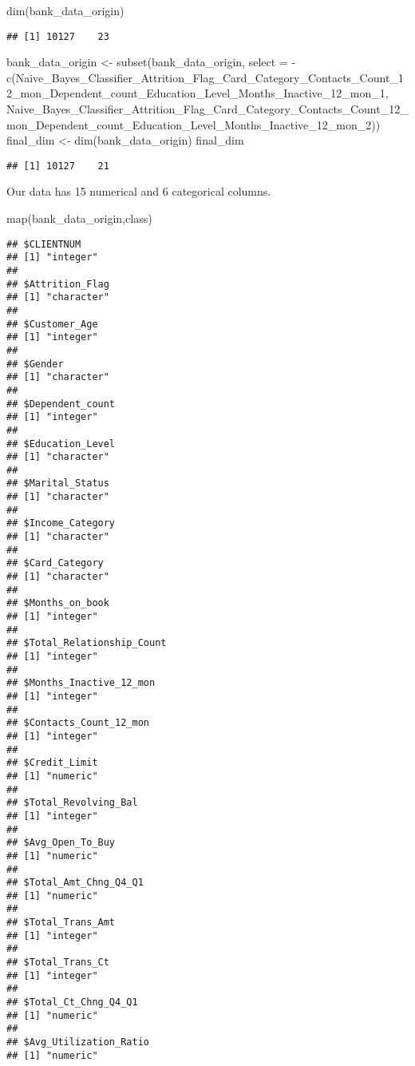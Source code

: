 \documentclass[
]{article}
\newenvironment{Shaded}{\begin{snugshade}}{\end{snugshade}}
\newcommand{\AttributeTok}[1]{\textcolor[rgb]{0.77,0.63,0.00}{#1}}
\newcommand{\FunctionTok}[1]{\textcolor[rgb]{0.00,0.00,0.00}{#1}}
\newcommand{\NormalTok}[1]{#1}
\newcommand{\OtherTok}[1]{\textcolor[rgb]{0.56,0.35,0.01}{#1}}
\newcommand{\SpecialCharTok}[1]{\textcolor[rgb]{0.00,0.00,0.00}{#1}}
\begin{document}
\begin{Shaded}
\begin{Highlighting}[]
\FunctionTok{dim}\NormalTok{(bank\_data\_origin)}
\end{Highlighting}
\end{Shaded}

\begin{verbatim}
## [1] 10127    23
\end{verbatim}

\begin{Shaded}
\begin{Highlighting}[]
\NormalTok{bank\_data\_origin }\OtherTok{\textless{}{-}} \FunctionTok{subset}\NormalTok{(bank\_data\_origin, }\AttributeTok{select =} \SpecialCharTok{{-}}\FunctionTok{c}\NormalTok{(Naive\_Bayes\_Classifier\_Attrition\_Flag\_Card\_Category\_Contacts\_Count\_12\_mon\_Dependent\_count\_Education\_Level\_Months\_Inactive\_12\_mon\_1, Naive\_Bayes\_Classifier\_Attrition\_Flag\_Card\_Category\_Contacts\_Count\_12\_mon\_Dependent\_count\_Education\_Level\_Months\_Inactive\_12\_mon\_2))}
\NormalTok{final\_dim }\OtherTok{\textless{}{-}} \FunctionTok{dim}\NormalTok{(bank\_data\_origin)}
\NormalTok{final\_dim}
\end{Highlighting}
\end{Shaded}

\begin{verbatim}
## [1] 10127    21
\end{verbatim}

Our data has 15 numerical and 6 categorical columns.

\begin{Shaded}
\begin{Highlighting}[]
\FunctionTok{map}\NormalTok{(bank\_data\_origin,class)}
\end{Highlighting}
\end{Shaded}

\begin{verbatim}
## $CLIENTNUM
## [1] "integer"
## 
## $Attrition_Flag
## [1] "character"
## 
## $Customer_Age
## [1] "integer"
## 
## $Gender
## [1] "character"
## 
## $Dependent_count
## [1] "integer"
## 
## $Education_Level
## [1] "character"
## 
## $Marital_Status
## [1] "character"
## 
## $Income_Category
## [1] "character"
## 
## $Card_Category
## [1] "character"
## 
## $Months_on_book
## [1] "integer"
## 
## $Total_Relationship_Count
## [1] "integer"
## 
## $Months_Inactive_12_mon
## [1] "integer"
## 
## $Contacts_Count_12_mon
## [1] "integer"
## 
## $Credit_Limit
## [1] "numeric"
## 
## $Total_Revolving_Bal
## [1] "integer"
## 
## $Avg_Open_To_Buy
## [1] "numeric"
## 
## $Total_Amt_Chng_Q4_Q1
## [1] "numeric"
## 
## $Total_Trans_Amt
## [1] "integer"
## 
## $Total_Trans_Ct
## [1] "integer"
## 
## $Total_Ct_Chng_Q4_Q1
## [1] "numeric"
## 
## $Avg_Utilization_Ratio
## [1] "numeric"
\end{verbatim}
\end{document}
